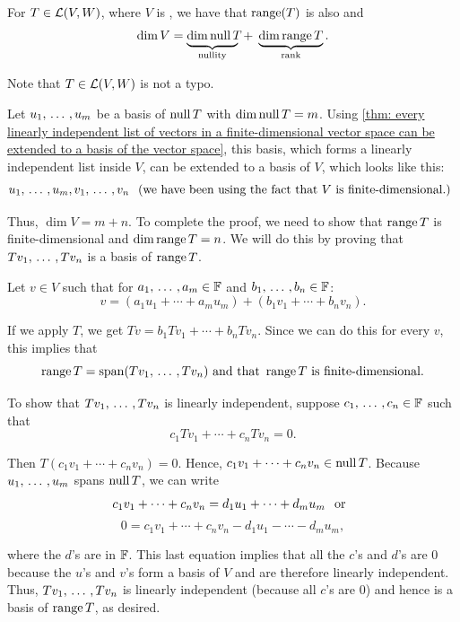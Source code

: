 \setcounter{thm}{20}
\begin{thm} 
  \label{rank-nullity-theorem}
  For $T \in \mathcal{L}(V,W)$, where $V$ is \fd, we have that $\operatorname{range}(T)$ is also \fd and
  \begin{equation}
    \dim V =
    \underbrace{ \dim\operatorname{null} T\phantom{g}\!\!\!\!\!}_{\text{nullity}}
    \; + \; \underbrace{\dim \operatorname{range} T}_{\text{rank}}.
  \end{equation}

  Note that $T \in \mathcal{L}(V,W)$ is not a typo.
\end{thm}
\begin{prf}
  Let $u_1, {\, \ldots \,\,}, u_m$ be a basis of $\operatorname{null} T$ with $\dim \operatorname{null} T = m$. Using \ref{thm: every linearly independent list of vectors in a finite-dimensional vector space can be extended to a basis of the vector space}, this basis, which forms a linearly independent list inside $V$, can be extended to a basis of $V$, which looks like this:
  \[
    u_1, {\, \ldots \,\,}, u_m, v_1, {\, \ldots \,\,}, v_n \;\;\, \text{(we have been using the fact that $V$ is finite-dimensional.)}\;\;
  \]

  Thus, $\dim V = m+n$. To complete the proof, we need to show that $\operatorname{range} T$ is finite-dimensional and $\dim \operatorname{range} T = n$. We will do this by proving that $Tv_1, {\, \ldots \,\,}, Tv_n$ is a basis of $\operatorname{range} T$.

  Let $v \in V$ such that for $a_1, {\, \ldots \,\,}, a_m \in \mathbb{F}$ and $b_1, {\, \ldots \,\,}, b_n \in \mathbb{F}$:
  \[
    v= (a_1 u_1 + \cdots + a_m  u_m) + (b_1 v_1 + \cdots + b_n v_n).
  \]

  If we apply $T$, we get $Tv=b_1Tv_1+ \cdots + b_nTv_n$. Since we can do this for every $v$, this implies that
  \[
    \operatorname{range} T = \operatorname{span} (Tv_1, {\, \ldots \,\,}, Tv_n) \text{ and that } \operatorname{range} T \text{ is finite-dimensional.}
  \]

  To show that $Tv_1, {\, \ldots \,\,}, Tv_n$ is linearly independent, suppose $c_1, {\, \ldots \,\,}, c_n \in \mathbb{F}$ such that
  \[
    c_1 Tv_1 + \cdots + c_n T v_n = 0.
  \]

  Then $T(c_1 v_1 + \cdots + c_n v_n) = 0$. Hence, $c_1 v_1 + \cdots + c_n v_n \in \operatorname{null} T$. Because $u_1, {\, \ldots \,\,}, u_m$ spans $\operatorname{null} T$, we can write
  \[
    c_1 v_1 + \cdots + c_n v_n = d_1 u_1 + \cdots + d_m u_m \;\;\, \text{or}\;\;
  \]
  \[
  0 = c_1 v_1 + \cdots + c_n v_n - d_1 u_1 - \cdots - d_m u_m,
  \]

  where the $d$'s are in $\mathbb{F}$. This last equation implies that all the $c$'s and $d$'s are $0$ because the $u$'s and $v$'s form a basis of $V$ and are therefore linearly independent. Thus, $Tv_1, {\, \ldots \,\,}, Tv_n$ is linearly independent (because all $c$'s are $0$) and hence is a basis of $\operatorname{range} T$, as desired.
\end{prf}


